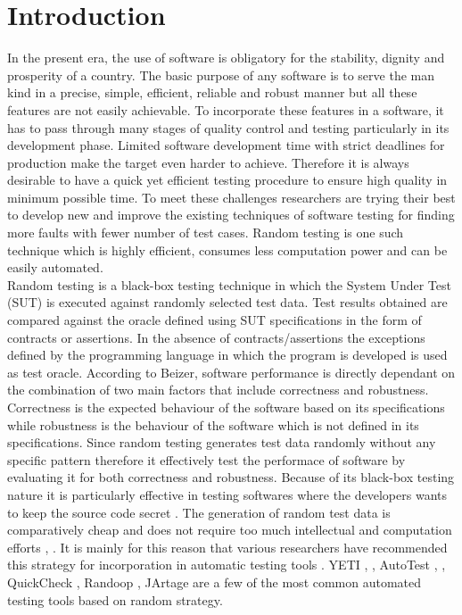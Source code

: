 \section{Introduction}
In the present era, the use of software is obligatory for the stability, dignity and  prosperity of a country. The basic purpose of any software is to serve the man kind in a  precise, simple, efficient, reliable and robust manner but all these features are not easily achievable. To incorporate these features in a software, it has to pass through many stages of quality control and testing particularly in its development phase. Limited software development time with strict deadlines for production make the target even harder to achieve. Therefore it is always desirable to have a quick yet efficient testing procedure to ensure high quality in minimum possible time. To meet these challenges researchers are trying their best to develop new and improve the existing techniques of software testing for finding more faults with fewer number of test cases. Random testing is one such technique which is highly efficient, consumes less computation power and can be easily automated.\\

Random testing is a black-box testing technique in which the System Under Test (SUT) is executed against randomly selected test data. Test results obtained are compared against the oracle defined using SUT specifications in the form of contracts or assertions. In the absence of contracts/assertions the exceptions defined by the programming language in which the program is developed is used as test oracle. According to Beizer, \cite{Beizer1990} software performance is directly dependant on the combination of two main factors that include correctness and robustness. Correctness is the expected behaviour of the software based on its specifications while robustness is the behaviour of the software which is not defined in its specifications. Since random testing generates test data randomly without any specific pattern therefore it effectively test the performace of software by evaluating it for both correctness and robustness. Because of its black-box testing nature it is particularly effective in testing softwares where the developers wants to keep the source code secret \cite{Chen2010}. The generation of random test data is comparatively cheap and does not require too much intellectual and computation efforts \cite{Ciupa2009}, \cite{Ciupa2008}. It is mainly for this reason that various researchers have recommended this strategy for incorporation in automatic testing tools \cite{Ciupa2008a}. YETI \cite{Oriol2010a}, \cite{Oriol2010}, AutoTest \cite{Leitner2007}, \cite{Ciupa2007}, QuickCheck \cite{Claessen2000}, Randoop \cite{Pacheco2007}, JArtage \cite{Oriat2004} are a few of the most common automated testing tools based on random strategy.\\

